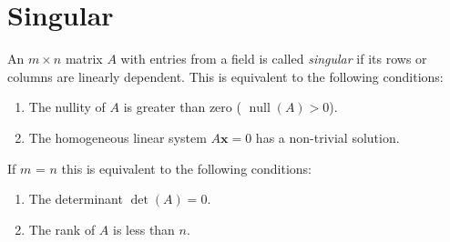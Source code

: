 \documentclass{article}
\begin{document}
\section{Singular}


An $ m \times n$ matrix $ A$ with entries from a field is called \emph{singular} if its rows or columns are linearly dependent. This is equivalent to the following conditions:
\begin{enumerate}
\item
The nullity of $ A$ is greater than zero ( $ \operatorname{null}(A) > 0$).
\item
The homogeneous linear system $ A\mathbf{x} = 0 $ has a non-trivial solution.
\end{enumerate}

If $m$ = $n$ this is equivalent to the following conditions:
\begin{enumerate}
\item
The determinant $ \det(A)=0$.
\item
The rank of $ A$ is less than $ n$.
\end{enumerate}
\end{document}
